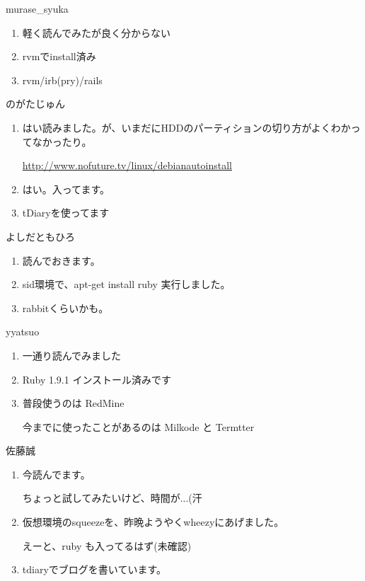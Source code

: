 \documentclass[mingoth,a4paper]{jsarticle}
\begin{document}
\begin{prework}{ murase\_{}syuka }
  \begin{enumerate}
  \item 軽く読んでみたが良く分からない
  \item rvmでinstall済み
  \item rvm/irb(pry)/rails
  \end{enumerate}
\end{prework}

\begin{prework}{ のがたじゅん }
  \begin{enumerate}
  \item はい読みました。が、いまだにHDDのパーティションの切り方がよくわかってなかったり。

    \url{http://www.nofuture.tv/linux/debianautoinstall}
  \item はい。入ってます。
  \item tDiaryを使ってます
  \end{enumerate}
\end{prework}

\begin{prework}{ よしだともひろ }
  \begin{enumerate}
  \item 読んでおきます。
  \item sid環境で、apt-get install ruby 実行しました。
  \item rabbitくらいかも。
  \end{enumerate}
\end{prework}

\begin{prework}{ yyatsuo }
  \begin{enumerate}
  \item 一通り読んでみました
  \item Ruby 1.9.1 インストール済みです
  \item 普段使うのは RedMine

    今までに使ったことがあるのは Milkode と Termtter
  \end{enumerate}
\end{prework}

\begin{prework}{ 佐藤誠 }
  \begin{enumerate}
  \item 今読んでます。

    ちょっと試してみたいけど、時間が...(汗
  \item 仮想環境のsqueezeを、昨晩ようやくwheezyにあげました。

    えーと、ruby も入ってるはず(未確認)
  \item tdiaryでブログを書いています。
  \end{enumerate}
\end{prework}
\end{document}
